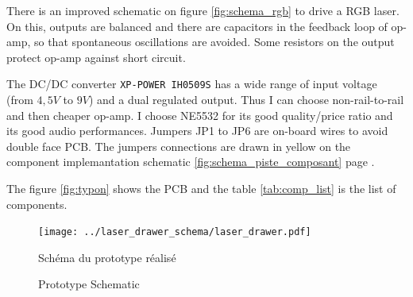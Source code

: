 \begin{appendices}
\begin{en}
There is an improved schematic on figure \ref{fig:schema_rgb} to drive a RGB laser.
On this, outputs are balanced and there are capacitors in the feedback loop of op-amp, so that spontaneous oscillations are avoided.
Some resistors on the output protect op-amp against short circuit.

The DC/DC converter \texttt{XP-POWER IH0509S} has a wide range of input voltage (from $4,5\unit{V}$ to $9\unit{V}$) and a dual regulated output.
Thus I can choose non-rail-to-rail and then cheaper op-amp.
I choose NE5532 for its good quality/price ratio and its good audio performances.
Jumpers JP1 to JP6 are on-board wires to avoid double face PCB.
The jumpers connections are drawn in yellow on the component implemantation schematic \ref{fig:schema_piste_composant} page \pageref{fig:schema_piste_composant}.

The figure \ref{fig:typon} shows the PCB and the table \ref{tab:comp_list} is the list of components.
\end{en}


\begin{figure}[ht]
\begin{bigcenter}
\texttt{[image: ../laser\_drawer\_schema/laser\_drawer.pdf]}
\end{bigcenter}
\begin{fr}
\caption{Schéma du prototype réalisé}
\label{schema_beta}
\end{fr}
\begin{en}
\caption{Prototype Schematic}
\label{schema_beta}
\end{en}
\end{figure}


\end{appendices}
